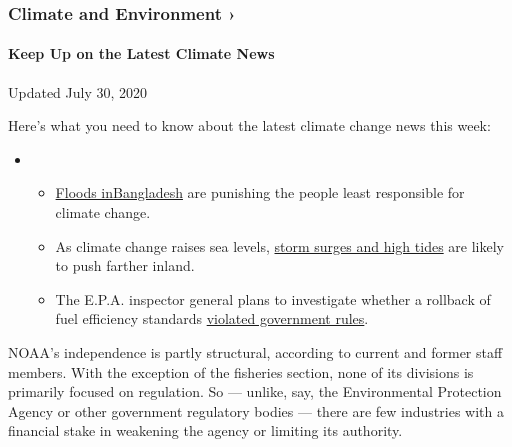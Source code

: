 \href{https://www.nytimes.com/section/climate?action=click\&pgtype=Article\&state=default\&region=MAIN_CONTENT_1\&context=storylines_keepup}{}

\hypertarget{climate-and-environment-}{%
\subsubsection{Climate and Environment
›}\label{climate-and-environment-}}

\hypertarget{keep-up-on-the-latest-climate-news}{%
\paragraph{Keep Up on the Latest Climate
News}\label{keep-up-on-the-latest-climate-news}}

Updated July 30, 2020

Here's what you need to know about the latest climate change news this
week:

\begin{itemize}
\item
  \begin{itemize}
  \tightlist
  \item
    \href{https://www.nytimes.com/2020/07/30/climate/bangladesh-floods.html?action=click\&pgtype=Article\&state=default\&region=MAIN_CONTENT_1\&context=storylines_keepup}{Floods
    in}\href{https://www.nytimes.com/2020/07/30/climate/bangladesh-floods.html?action=click\&pgtype=Article\&state=default\&region=MAIN_CONTENT_1\&context=storylines_keepup}{Bangladesh}
    are punishing the people least responsible for climate change.
  \item
    As climate change raises sea levels,
    \href{https://www.nytimes.com/2020/07/30/climate/sea-level-inland-floods.html?action=click\&pgtype=Article\&state=default\&region=MAIN_CONTENT_1\&context=storylines_keepup}{storm
    surges and high tides} are likely to push farther inland.
  \item
    The E.P.A. inspector general plans to investigate whether a rollback
    of fuel efficiency standards
    \href{https://www.nytimes.com/2020/07/27/climate/trump-fuel-efficiency-rule.html?action=click\&pgtype=Article\&state=default\&region=MAIN_CONTENT_1\&context=storylines_keepup}{violated
    government rules}.
  \end{itemize}
\end{itemize}

NOAA's independence is partly structural, according to current and
former staff members. With the exception of the fisheries section, none
of its divisions is primarily focused on regulation. So --- unlike, say,
the Environmental Protection Agency or other government regulatory
bodies --- there are few industries with a financial stake in weakening
the agency or limiting its authority.

